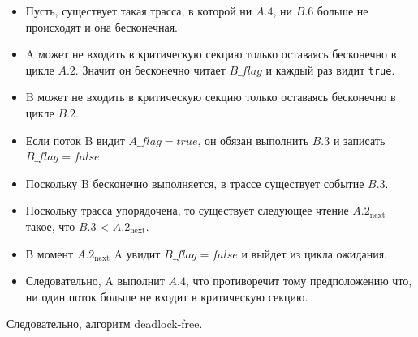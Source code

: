 \documentclass[a4paper,12pt]{article}
\begin{document}
\begin{itemize}

\item Пусть, существует такая трасса, в которой ни $A.4$, ни $B.6$ больше не происходят и она бесконечная.

\item A может не входить в критическую секцию только оставаясь бесконечно в цикле $A.2$.
Значит он бесконечно читает $B\_flag$ и каждый раз видит \texttt{true}.

\item B может не входить в критическую секцию только оставаясь бесконечно в цикле $B.2$.

\item Если поток B видит $A\_flag = true$, он обязан выполнить $B.3$ и записать $B\_flag = false$.

\item Поскольку B бесконечно выполняется, в трассе существует событие $B.3$.

\item Поскольку трасса упорядочена, то существует следующее чтение
$A.2_{\text{next}}$ такое, что $B.3$ < $A.2_{\text{next}}$.

\item В момент $A.2_{\text{next}}$  A увидит $B\_flag = false$ и выйдет из цикла ожидания.

\item Следовательно, A выполнит $A.4$, что противоречит тому предположению что, ни один поток больше не входит
в критическую секцию.

\end{itemize}

Следовательно, алгоритм deadlock-free.
\end{document}
